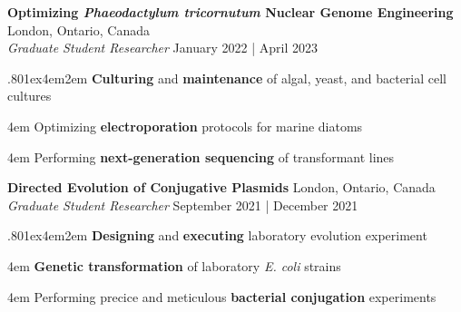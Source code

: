 \documentclass[a4paper,9pt]{extarticle}
\begin{document}
\noindent
\begin{minipage}{1\textwidth}
\setlength{\parindent}{15pt} %
\noindent
	\textbf{Optimizing \textit{Phaeodactylum tricornutum} Nuclear Genome Engineering} \hfill London, Ontario, Canada\\ %
	\textit{Graduate Student Researcher}
	\hfill January 2022 | April 2023 \par %
	{\hsize.80\linewidth\parskip1ex\hangindent4em\parindent2em 
	\setlength{\parskip}{0pt} %
		\textbf{Culturing} and \textbf{maintenance} of algal, yeast, and bacterial cell cultures\par	
		\hangindent4em
		Optimizing \textbf{electroporation} protocols for marine diatoms\par
		\hangindent4em
		Performing \textbf{next-generation sequencing} of transformant lines\par}
\end{minipage}
\vspace{\parskip}

\noindent
\begin{minipage}{1\textwidth}
\setlength{\parindent}{15pt} %
	\noindent
	\textbf{Directed Evolution of Conjugative Plasmids} \hfill London, Ontario, Canada\\ %
	\textit{Graduate Student Researcher}
	\hfill September 2021 | December 2021  \par %
	{\hsize.80\linewidth\parskip1ex\hangindent4em\parindent2em 
	\setlength{\parskip}{0pt} %
		\textbf{Designing} and \textbf{executing} laboratory evolution experiment\par
		\hangindent4em
		\textbf{Genetic transformation} of laboratory \textit{E. coli} strains\par
		\hangindent4em
		Performing precice and meticulous \textbf{bacterial conjugation} experiments \par} %
\end{minipage}
\vspace{\parskip}
\end{document}
